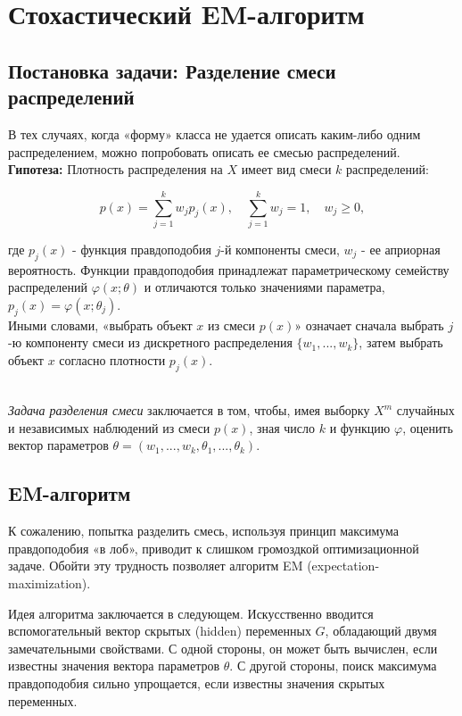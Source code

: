 \section*{Стохастический EM-алгоритм}

\subsection*{Постановка задачи: Разделение смеси распределений}

В тех случаях, когда «форму» класса не удается описать каким-либо одним распределением, можно попробовать описать ее смесью распределений. \\

\noindent
\textbf{Гипотеза:} Плотность распределения на $X$ имеет вид смеси $k$ распределений:

$$
p(x) = \sum_{j=1}^{k} w_j p_j(x), \quad \sum_{j=1}^{k} w_j = 1, \quad w_j \geq 0,
$$

где $p_j(x)$ - функция правдоподобия $j$-й компоненты смеси, $w_j$ - ее априорная вероятность. Функции правдоподобия принадлежат параметрическому семейству распределений $\varphi(x; \theta)$ и отличаются только значениями параметра, $p_j(x) = \varphi(x; \theta_j)$.
\newline \\

Иными словами, «выбрать объект $x$ из смеси $p(x)$» означает сначала выбрать $j$-ю компоненту смеси из дискретного распределения $\{w_1, ..., w_k\}$, затем выбрать объект $x$ согласно плотности $p_j(x)$.

\newline \\
\textit{Задача разделения смеси} заключается в том, чтобы, имея выборку $X^m$ случайных и независимых наблюдений из смеси $p(x)$, зная число $k$ и функцию $\varphi$, оценить вектор параметров $\theta = (w_1, ..., w_k, \theta_1, ..., \theta_k)$.

\subsection*{EM-алгоритм}

К сожалению, попытка разделить смесь, используя принцип максимума правдоподобия «в лоб», приводит к слишком громоздкой оптимизационной задаче. Обойти эту трудность позволяет алгоритм EM (expectation-maximization). 

Идея алгоритма заключается в следующем. Искусственно вводится вспомогательный вектор скрытых (hidden) переменных $G$, обладающий двумя замечательными свойствами. С одной стороны, он может быть вычислен, если известны значения вектора параметров $\theta$. С другой стороны, поиск максимума правдоподобия сильно упрощается, если известны значения скрытых переменных.

